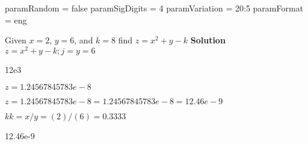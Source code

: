 paramRandom = false
paramSigDigits = 4
paramVariation = 20:5
paramFormat = eng


\question Given \mbox{$x = 2$}, \mbox{$y = 6$}, and \mbox{$k = 8$} find $z = x^2+y-k$
\textbf{Solution}
\mbox{$z=x^2+y-k; j=y  = 6$}\\ 

12e3

\mbox{$z=1.24567845783e-8 $}

\mbox{$z=1.24567845783e-8  = 1.24567845783e-8 = 12.46e-9$}

\mbox{$kk = x/y  =  (2)/(6) = 0.3333$}

12.46e-9



